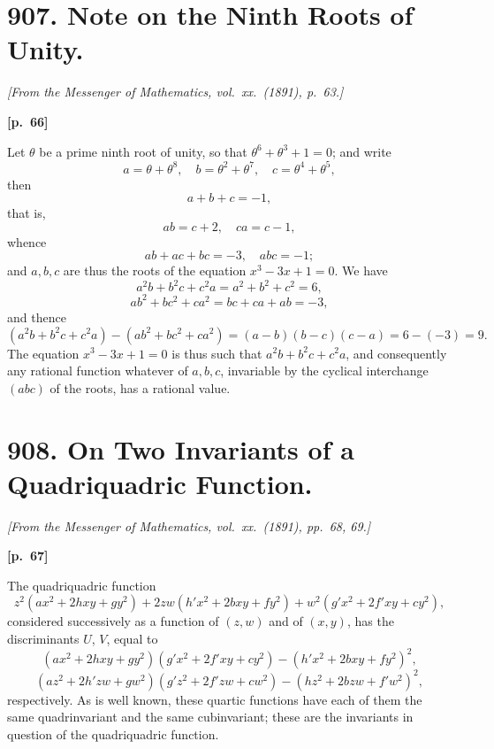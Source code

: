 \documentclass[11pt,a4paper]{book}
\begin{document}
\newpage

\section*{907. Note on the Ninth Roots of Unity.}

\noindent\textit{[From the Messenger of Mathematics, vol.\ xx.\ (1891), p.\ 63.]}

\vspace{0.5em}
\noindent\textbf{[p.\ 66]}

Let $\theta$ be a prime ninth root of unity, so that $\theta^6 + \theta^3 + 1 = 0$; and write
$$
a = \theta + \theta^8, \quad b = \theta^2 + \theta^7, \quad c = \theta^4 + \theta^5,
$$
then
$$
a + b + c = -1,
$$
that is,
$$
ab = c + 2, \quad ca = c - 1,
$$
whence
$$
ab + ac + bc = -3, \quad abc = -1;
$$
and $a, b, c$ are thus the roots of the equation $x^3 - 3x + 1 = 0$. We have
$$
a^2 b + b^2 c + c^2 a = a^2 + b^2 + c^2 = 6,
$$
$$
ab^2 + bc^2 + ca^2 = bc + ca + ab = -3,
$$
and thence
$$
(a^2 b + b^2 c + c^2 a) - (ab^2 + bc^2 + ca^2) = (a - b)(b - c)(c - a) = 6 - (-3) = 9.
$$
The equation $x^3 - 3x + 1 = 0$ is thus such that $a^2 b + b^2 c + c^2 a$, and consequently any rational function whatever of $a, b, c$, invariable by the cyclical interchange $(abc)$ of the roots, has a rational value.

\newpage

\section*{908. On Two Invariants of a Quadriquadric Function.}

\noindent\textit{[From the Messenger of Mathematics, vol.\ xx.\ (1891), pp.\ 68, 69.]}

\vspace{0.5em}
\noindent\textbf{[p.\ 67]}

The quadriquadric function
$$
z^2(ax^2 + 2hxy + gy^2) + 2zw(h'x^2 + 2bxy + fy^2) + w^2(g'x^2 + 2f'xy + cy^2),
$$
considered successively as a function of $(z, w)$ and of $(x, y)$, has the discriminants $U$, $V$, equal to
$$
(ax^2 + 2hxy + gy^2)(g'x^2 + 2f'xy + cy^2) - (h'x^2 + 2bxy + fy^2)^2,
$$
$$
(az^2 + 2h'zw + gw^2)(g'z^2 + 2f'zw + cw^2) - (hz^2 + 2bzw + f'w^2)^2,
$$
respectively. As is well known, these quartic functions have each of them the same quadrinvariant and the same cubinvariant; these are the invariants in question of the quadriquadric function.
\end{document}
